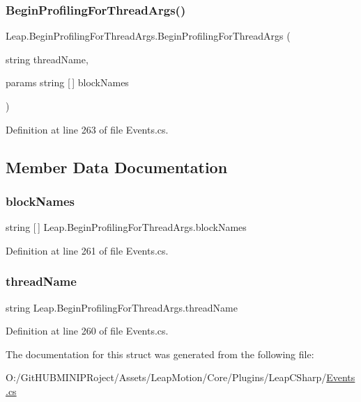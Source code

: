 \subsubsection{\texorpdfstring{BeginProfilingForThreadArgs()}{BeginProfilingForThreadArgs()}}
{\footnotesize\ttfamily Leap.\+Begin\+Profiling\+For\+Thread\+Args.\+Begin\+Profiling\+For\+Thread\+Args (\begin{DoxyParamCaption}\item[{string}]{thread\+Name,  }\item[{params string \mbox{[}$\,$\mbox{]}}]{block\+Names }\end{DoxyParamCaption})}



Definition at line 263 of file Events.\+cs.



\subsection{Member Data Documentation}
\mbox{\label{struct_leap_1_1_begin_profiling_for_thread_args_abffe2800fbd8fe1f4958232a90275fc9}} 
\subsubsection{\texorpdfstring{blockNames}{blockNames}}
{\footnotesize\ttfamily string \mbox{[}$\,$\mbox{]} Leap.\+Begin\+Profiling\+For\+Thread\+Args.\+block\+Names}



Definition at line 261 of file Events.\+cs.

\mbox{\label{struct_leap_1_1_begin_profiling_for_thread_args_aea71e9ec323e539312755f4358bfc96d}} 
\subsubsection{\texorpdfstring{threadName}{threadName}}
{\footnotesize\ttfamily string Leap.\+Begin\+Profiling\+For\+Thread\+Args.\+thread\+Name}



Definition at line 260 of file Events.\+cs.



The documentation for this struct was generated from the following file\+:\begin{DoxyCompactItemize}
\item 
O\+:/\+Git\+H\+U\+B\+M\+I\+N\+I\+P\+Roject/\+Assets/\+Leap\+Motion/\+Core/\+Plugins/\+Leap\+C\+Sharp/\mbox{\hyperlink{_events_8cs}{Events.\+cs}}\end{DoxyCompactItemize}
